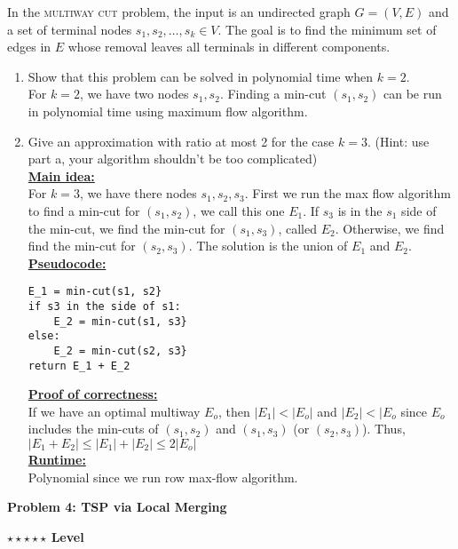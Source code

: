 \documentclass{article}\usepackage[utf8]{inputenc}\usepackage[margin=0.4cm,top=0.4cm,bottom=0.4cm]{geometry}\usepackage[usenames,dvipsnames,svgnames,table]{xcolor}
\begin{document}
\noindent In the \textsc{multiway cut} problem, the input is an undirected graph $G = (V,E)$ and a set of terminal nodes $s_1,s_2,\ldots,s_k \in V$. The goal is to find the minimum set of edges in $E$ whose removal leaves all terminals in different components.

\begin{enumerate}
\item Show that this problem can be solved in polynomial time when $k = 2$.
\BeginSolution %
\\
For $k = 2$, we have two nodes $s_1, s_2$. Finding a min-cut $(s_1, s_2)$ can be run in polynomial time using maximum flow algorithm.
\EndSolution

\item Give an approximation with ratio at most 2 for the case $k = 3$. (Hint: use part a, your algorithm
shouldn't be too complicated)
\BeginSolution %
\\
\underline{\textbf{Main idea:}}
\\
For $k = 3$, we have there nodes $s_1, s_2, s_3$. First we run the max flow algorithm to find a min-cut for $(s_1, s_2)$, we call this one $E_1$. If $s_3$ is in the $s_1$ side of the min-cut, we find the min-cut for $(s_1, s_3)$, called $E_2$. Otherwise, we find find the min-cut for $(s_2, s_3)$. The solution is the union of $E_1$ and $E_2$.\\
\underline{\textbf{Pseudocode:}}
%
\begin{lstlisting}
E_1 = min-cut(s1, s2}
if s3 in the side of s1:
	E_2 = min-cut(s1, s3}
else:
	E_2 = min-cut(s2, s3}
return E_1 + E_2
\end{lstlisting}
%
\underline{\textbf{Proof of correctness:}}
\\
If we have an optimal multiway $E_o$, then $|E_1| < |E_o|$ and $|E_2| < |E_o$ since $E_o$ includes the min-cuts of $(s_1, s_2)$ and $(s_1, s_3)$ (or $(s_2, s_3)$). Thus, $|E_1 + E_2| \leq |E_1| + |E_2| \leq 2|E_o|$\\
\underline{\textbf{Runtime:}}
\\
Polynomial since we run row max-flow algorithm.
\EndSolution
\end{enumerate}
\clearpage

\vspace{-2mm}\noindent\begin{mybox}{\begin{center}\textbf{\color{black}Problem 4: TSP via Local Merging}\end{center}}\end{mybox}\vspace{-2mm}
\begin{myboxot}\noindent\textbf{$\star\star\star\star\star$ Level}\end{myboxot} 
\end{document}
